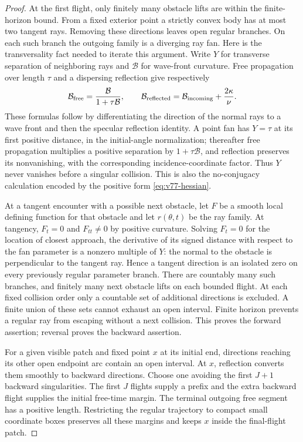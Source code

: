 \begin{proof}
At the first flight, only finitely many obstacle lifts are within the
finite-horizon bound.  From a fixed exterior point a strictly convex
body has at most two tangent rays.  Removing these directions leaves
open regular branches.  On each such branch the outgoing family is a
diverging ray fan.  Here is the transversality fact needed to iterate
this argument.  Write $Y$ for transverse separation of neighboring rays
and $\mathcal B$ for wave-front curvature.  Free propagation over length
$\tau$ and a dispersing reflection give respectively
\begin{equation}\label{eq:v77-fan-curvature}
 \mathcal B_{\rm free}=\frac{\mathcal B}{1+\tau\mathcal B},
 \qquad
 \mathcal B_{\rm reflected}=\mathcal B_{\rm incoming}
                                  +\frac{2\kappa}{\nu}.
\end{equation}
These formulas follow by differentiating the direction of the normal
rays to a wave front and then the specular reflection identity.  A point
fan has $Y=\tau$ at its first positive distance, in the initial-angle
normalization; thereafter free propagation multiplies a positive
separation by $1+\tau\mathcal B$, and reflection preserves its
nonvanishing, with the corresponding incidence-coordinate factor.
Thus $Y$ never vanishes before a singular collision.  This is also the
no-conjugacy calculation encoded by the positive form
\eqref{eq:v77-hessian}.

At a tangent encounter with a possible next obstacle, let $F$ be a
smooth local defining function for that obstacle and let
$r(\theta,t)$ be the ray family.  At tangency, $F_t=0$ and
$F_{tt}\ne0$ by positive curvature.  Solving $F_t=0$ for the
location of closest approach, the derivative of its signed distance
with respect to the fan parameter is a nonzero multiple of $Y$:
the normal to the obstacle is perpendicular to the tangent ray.
Hence a tangent direction is an isolated zero on every previously
regular parameter branch.  There are countably many such branches,
and finitely many next obstacle lifts on each bounded flight.  At each
fixed collision order only a countable set of additional directions is
excluded.  A finite union of these sets cannot exhaust an open interval.
Finite horizon prevents a regular ray from escaping without a next
collision.  This proves the forward assertion; reversal proves the
backward assertion.

For a given visible patch and fixed point $x$ at its initial end,
directions reaching its other open endpoint arc contain an open interval.
At $x$, reflection converts them smoothly to backward directions.
Choose one avoiding the first $J+1$ backward singularities.  The first
$J$ flights supply a prefix and the extra backward flight supplies the
initial free-time margin.  The terminal outgoing free segment has a
positive length.  Restricting the regular trajectory to compact small
coordinate boxes preserves all these margins and keeps $x$ inside the
final-flight patch.
\end{proof}

